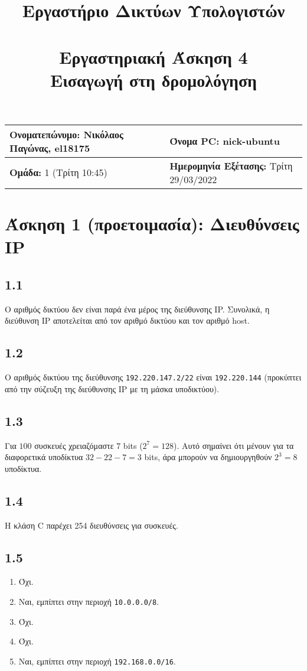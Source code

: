\documentclass[a4paper, 12pt]{article}
\title{
	\textbf{Εργαστήριο Δικτύων Υπολογιστών} \\~\\
	Εργαστηριακή Άσκηση 4 \\ 
	Εισαγωγή στη δρομολόγηση
}
\author{}
\date{}
\begin{document}
\maketitle
\begin{center}
	\begin{tabular}{|l|l|}
		\hline
		\textbf{Ονοματεπώνυμο:} Νικόλαος Παγώνας, el18175  & \textbf{Όνομα PC:} nick-ubuntu \\
		\hline
		\textbf{Ομάδα:} 1 (Τρίτη 10:45) & \textbf{Ημερομηνία Εξέτασης:} Τρίτη 29/03/2022 \\
		\hline
	\end{tabular}
\end{center}

\section*{Άσκηση 1 (προετοιμασία): Διευθύνσεις IP}

	\subsection*{1.1}
		Ο αριθμός δικτύου δεν είναι παρά ένα μέρος της διεύθυνσης IP. Συνολικά, η διεύθυνση IP αποτελείται από τον αριθμό δικτύου και τον αριθμό host.

	\subsection*{1.2}
		Ο αριθμός δικτύου της διεύθυνσης \verb|192.220.147.2/22| είναι \verb|192.220.144| (προκύπτει από την σύζευξη της διεύθυνσης IP με τη μάσκα υποδικτύου).

	\subsection*{1.3}
		Για $100$ συσκευές χρειαζόμαστε $7$ bits ($2^7 = 128$). Αυτό σημαίνει ότι μένουν για τα διαφορετικά υποδίκτυα $32 - 22 - 7 = 3$ bits, άρα μπορούν να δημιουργηθούν $2^3 = 8$ υποδίκτυα.

	\subsection*{1.4}
		Η κλάση C παρέχει 254 διευθύνσεις για συσκευές.

	\subsection*{1.5}
		\begin{enumerate}[label=\alph*.]
			\item Όχι. 
			\item Ναι, εμπίπτει στην περιοχή \verb|10.0.0.0/8|.
			\item Όχι.
			\item Όχι.
			\item Nαι, εμπίπτει στην περιοχή \verb|192.168.0.0/16|.
		\end{enumerate}
\end{document}
